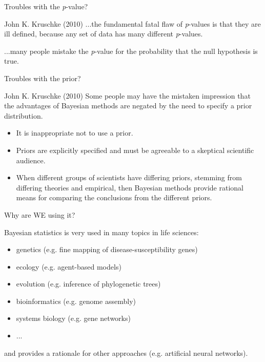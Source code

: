 \begin{frame}{Troubles with the \textit{p}-value?}

	\begin{block}{John K. Kruschke (2010)}
		...the fundamental fatal flaw of \textit{p}-values is that 
		they are ill defined, because any set of data has many different \textit{p}-values.

            	...many people mistake the \textit{p}-value for the probability that the null 
		hypothesis is true. 

	\end{block}

\end{frame}

\begin{frame}{Troubles with the prior?}

	\begin{block}{John K. Kruschke (2010)}
		Some people may have the mistaken impression that the advantages of 
		Bayesian methods are negated by the need to specify a prior distribution.
		\begin{itemize}
			\item It is inappropriate not to use a prior.
			\item Priors are explicitly specified and must be agreeable to a skeptical 
			scientific audience.
			\item When different groups of scientists have differing priors, 
			stemming from differing theories and empirical, then Bayesian methods provide 
			rational means for comparing the conclusions from the different priors.
		\end{itemize}
	\end{block}

\end{frame}

\begin{frame}{Why are WE using it?}

	\begin{block}{}
		Bayesian statistics is very used in many topics in life sciences:
		\begin{itemize}
			\item genetics (e.g. fine mapping of disease-susceptibility genes)
			\item ecology (e.g. agent-based models)
			\item evolution (e.g. inference of phylogenetic trees)
			\item bioinformatics (e.g. genome assembly)
			\item systems biology (e.g. gene networks)
			\item ...
		\end{itemize}
		and provides a rationale for other approaches (e.g. artificial neural networks).
	\end{block}

\end{frame}


